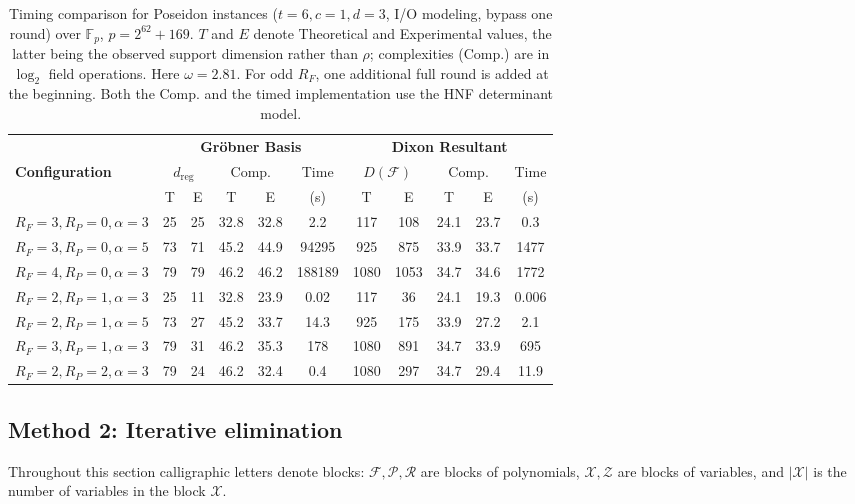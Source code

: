\begin{table}[h]
\centering
\caption{Timing comparison for Poseidon instances ($t=6, c=1, d=3$, I/O modeling, bypass one round) over $\mathbb{F}_p$, $p = 2^{62}+169$. $T$ and $E$ denote Theoretical and Experimental values, the latter being the observed support dimension rather than $\rho$; complexities (Comp.) are in $\log_2$ field operations. Here $\omega = 2.81$. For odd $R_F$, one additional full round is added at the beginning. Both the Comp. and the timed implementation use the HNF determinant model.}
\label{tab:poseidon-timing}
\small
\setlength{\tabcolsep}{4pt}
\renewcommand{\arraystretch}{1.2}
\begin{tabular}{lcccccccccc}
\toprule
& \multicolumn{5}{c}{\textbf{Gr\"obner Basis}} & \multicolumn{5}{c}{\textbf{Dixon Resultant}} \\
\cmidrule(lr){2-6} \cmidrule(lr){7-11}
\textbf{Configuration} & \multicolumn{2}{c}{$d_{\text{reg}}$} & \multicolumn{2}{c}{Comp.} & Time & \multicolumn{2}{c}{$D(\mathcal{F})$} & \multicolumn{2}{c}{Comp.} & Time \\
\cmidrule(lr){2-3} \cmidrule(lr){4-5} \cmidrule(lr){7-8} \cmidrule(lr){9-10}
& T & E & T & E & (s) & T & E & T & E & (s) \\
\midrule
$R_F=3, R_P=0, \alpha=3$      & 25  & 25 & 32.8 & 32.8 & 2.2      & 117  & 108  & 24.1 & 23.7 & 0.3    \\
$R_F=3, R_P=0, \alpha=5$      & 73  & 71 & 45.2 & 44.9 & 94295    & 925  & 875  & 33.9 & 33.7 & 1477   \\
$R_F=4, R_P=0, \alpha=3$      & 79  & 79 & 46.2 & 46.2 & 188189   & 1080 & 1053 & 34.7 & 34.6 & 1772   \\
\midrule
$R_F=2, R_P=1, \alpha=3$ & 25  & 11 & 32.8 & 23.9 & 0.02     & 117   & 36   & 24.1 & 19.3 & 0.006  \\
$R_F=2, R_P=1, \alpha=5$ & 73  & 27 & 45.2 & 33.7 & 14.3     & 925  & 175  & 33.9 & 27.2 & 2.1    \\
$R_F=3, R_P=1, \alpha=3$ & 79  & 31 & 46.2 & 35.3 & 178      & 1080 & 891  & 34.7 & 33.9 & 695   \\
$R_F=2, R_P=2, \alpha=3$ & 79  & 24 & 46.2 & 32.4 & 0.4      & 1080  & 297  & 34.7 & 29.4 & 11.9   \\
\bottomrule
\end{tabular}
\end{table}

\subsection{Method 2: Iterative elimination}\label{subsec:method2}
Throughout this section calligraphic letters denote blocks: $\mathcal{F},\mathcal{P},\mathcal{R}$ are blocks of polynomials, $\mathcal{X},\mathcal{Z}$ are blocks of variables, and $|\mathcal{X}|$ is the number of variables in the block $\mathcal{X}$.

